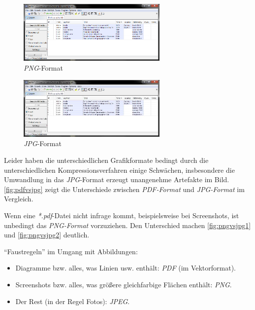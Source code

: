 \begin{figure}[p]
	\centering
  \includegraphics[width=0.65\textwidth]{Examples/jabref.png}
   \caption{\textit{PNG}-Format}
  \label{fig:pngvsjpg1}
\end{figure}

\begin{figure}[p]
	\centering
  \includegraphics[width=0.65\textwidth]{Examples/jabref.jpg}
   \caption{\textit{JPG}-Format}
  \label{fig:pngvsjpg2}
\end{figure}

Leider haben die unterschiedlichen Grafikformate bedingt durch die unterschiedlichen Kompressionsverfahren einige Schwächen, insbesondere die Umwandlung in das \textit{JPG}-Format erzeugt unangenehme Artefakte im Bild. \autoref{fig:pdfvsjpg} zeigt die Unterschiede zwischen \textit{PDF-Format} und \textit{JPG-Format} im Vergleich. 

Wenn eine \textit{*.pdf}-Datei nicht infrage kommt, beispielsweise bei Screenshots, ist unbedingt das \textit{PNG-Format} vorzuziehen. 
Den Unterschied machen \autoref{fig:pngvsjpg1} und \autoref{fig:pngvsjpg2} deutlich.

"`Faustregeln"' im Umgang mit Abbildungen:
\begin{itemize}
	\item Diagramme bzw. alles, was Linien usw. enthält: \textit{PDF} (im Vektorformat).
	\item Screenshots bzw. alles, was größere gleichfarbige Flächen enthält: \textit{PNG}.
	\item Der Rest (in der Regel Fotos): \textit{JPEG}.
\end{itemize}




